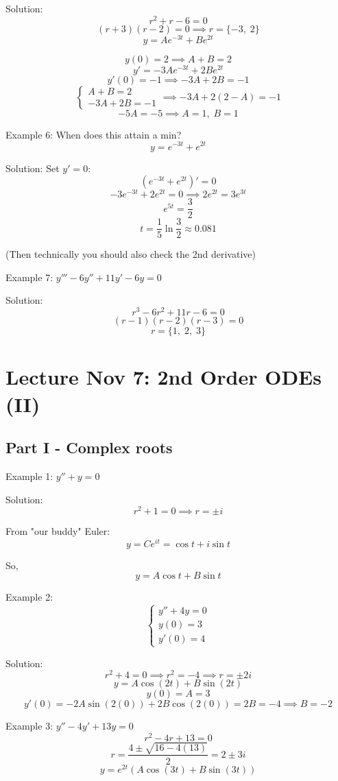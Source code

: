 \documentclass[12pt]{article}
\begin{document}
Solution:
\[r^2 + r - 6 = 0\]
\[(r + 3)(r - 2) = 0 \implies r = \{-3, \; 2\}\]
\[y = Ae^{-3t} + Be^{2t}\]

\[y(0) = 2 \implies A + B = 2\]
\[y' = -3Ae^{-3t} + 2Be^{2t}\]
\[y'(0) = -1 \implies -3A + 2B = -1\]
\[\begin{cases}
    A + B = 2\\
    -3A + 2B = -1
\end{cases} \implies -3A + 2(2 - A) = -1\]
\[-5A = -5 \implies A = 1, \; B = 1\]


Example 6: When does this attain a min?
\[y = e^{-3t} + e^{2t}\]

Solution:
Set $y' = 0$:
\[(e^{-3t} + e^{2t})' = 0\]
\[-3e^{-3t} + 2e^{2t} = 0 \implies 2e^{2t} = 3e^{3t}\]
\[e^{5t} = \frac{3}{2}\]
\[t = \frac{1}{5} \ln \frac{3}{2} \approx 0.081\]

(Then technically you should also check the 2nd derivative)

Example 7: $y''' - 6y'' + 11y' - 6y = 0$

Solution:
\[r^3 - 6r^2 + 11r - 6 = 0\] 
\[(r - 1)(r - 2)(r - 3) = 0\]
\[r = \{1,\; 2,\; 3\}\]

\section{Lecture Nov 7: 2nd Order ODEs (II)}
\subsection*{Part I - Complex roots}
Example 1: $y'' + y = 0$

Solution:
\[r^2 + 1 = 0 \implies r = \pm i \]

From "our buddy" Euler:
\[y = Ce^{it} = \cos t + i \sin t\]

So, 
\[y = A\cos t + B \sin t\]

Example 2: 
\[\begin{cases}
    y'' + 4y = 0\\
    y(0) = 3\\
    y'(0) = 4
\end{cases}\]

Solution:
\[r^2 + 4 = 0 \implies r^2 = -4 \implies r = \pm 2i\]
\[y = A\cos(2t) + B\sin (2t)\]
\[y(0) = A  = 3\]
\[y'(0) = -2A \sin(2(0)) + 2B\cos (2(0)) = 2B = -4 \implies B = -2\]

Example 3: $y'' - 4y' + 13y = 0$
\[r^2 - 4r + 13 = 0\]
\[r = \frac{4 \pm \sqrt{16 - 4(13)}}{2} = 2\pm 3i\]
\[y = e^{2t} (A\cos(3t) + B\sin(3t))\] 
\end{document}
